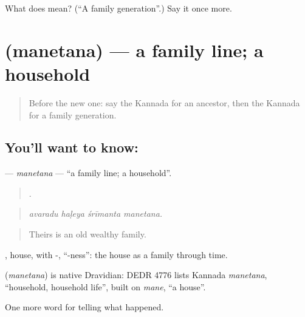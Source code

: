 \begin{tcolorbox}[breakable,colback=teal!4,colframe=teal!35!black,title={Before you move on}]
What does  mean? (\textquotedblleft{}A family generation\textquotedblright{}.) Say it once more.
\end{tcolorbox}
\section[\texorpdfstring{\kn{ಮನೆತನ} (manetana)}{ಮನೆತನ (manetana)}]{ (manetana) — a family line; a household}

\label{lesson:KA-C341-manetana}



\begin{quote}
Before the new one: say the Kannada for an ancestor, then the Kannada for a family generation.
\end{quote}

\subsection*{You'll want to know: }
\textbf{} — \emph{manetana} — \textquotedblleft{}a family line; a household\textquotedblright{}.

\begin{quote}
   .
\end{quote}

\begin{quote}
\emph{avaradu haḷeya śrīmanta manetana.}
\end{quote}

\begin{quote}
Theirs is an old wealthy family.
\end{quote}

, house, with -, \textquotedblleft{}-ness\textquotedblright{}: the house as a family through time.

\begin{cousinweb}
\textbf{} (\emph{manetana}) is native Dravidian: DEDR 4776 lists Kannada \emph{manetana}, \textquotedblleft{}household, household life\textquotedblright{}, built on \emph{mane}, \textquotedblleft{}a house\textquotedblright{}.
\end{cousinweb}

\begin{grammarlens}[title={What you've built}]
One more word for telling what happened.
\end{grammarlens}

